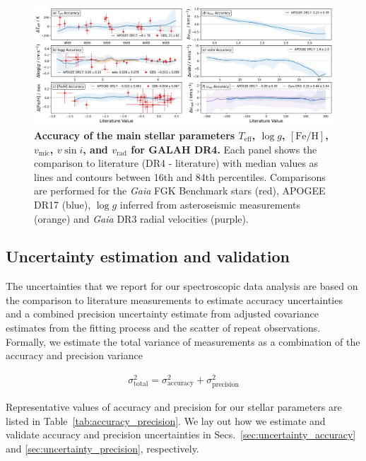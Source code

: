 \documentclass[
  journal=pasa,
  manuscript=research-paper, %
  year=2024,
  volume=37
]{cup-journal}
\newcommand{\Teff}{$T_\mathrm{eff}$\xspace}
\newcommand{\logg}{$\log g$\xspace}
\newcommand{\feh}{$\mathrm{[Fe/H]}$\xspace}
\newcommand{\vmic}{$v_\mathrm{mic}$\xspace}
\newcommand{\vsini}{$v \sin i$\xspace}
\newcommand{\vrad}{$v_\mathrm{rad}$\xspace}
\newcommand{\Gaia}{\textit{Gaia}\xspace}
\begin{document}
\begin{figure}[ht]
 \centering
 \includegraphics[width=\textwidth]{figures/galah_dr4_validation_parameter_accuracy_allstar.png}
 \caption{\textbf{Accuracy of the main stellar parameters \Teff, \logg, \feh, \vmic, \vsini, and \vrad for GALAH DR4.} Each panel shows the comparison to literature (DR4 - literature) with median values as lines and contours between 16th and 84th percentiles. Comparisons are performed for the \Gaia FGK Benchmark stars (red), APOGEE DR17 (blue), \logg inferred from asteroseismic measurements (orange) and \Gaia DR3 radial velocities (purple).}
 \label{fig:galah_dr4_validation_parameter_accuracy_allstar}
\end{figure}

\subsection{Uncertainty estimation and validation}
\label{sec:uncertainty}

The uncertainties that we report for our spectroscopic data analysis are based on the comparison to literature measurements \citep[see also][]{Beeson2024} to estimate accuracy uncertainties and a combined precision uncertainty estimate from adjusted covariance estimates from the fitting process and the scatter of repeat observations. Formally, we estimate the total variance of measurements as a combination of the accuracy and precision variance

\begin{align} \label{eq:total_uncertainty}
    \sigma_\mathrm{total}^2 = \sigma_\mathrm{accuracy}^2 + \sigma_\mathrm{precision}^2
\end{align}

Representative values of accuracy and precision for our stellar parameters are listed in Table~\ref{tab:accuracy_precision}. We lay out how we estimate and validate accuracy and precision uncertainties in Secs.~\ref{sec:uncertainty_accuracy} and \ref{sec:uncertainty_precision}, respectively.
\end{document}
